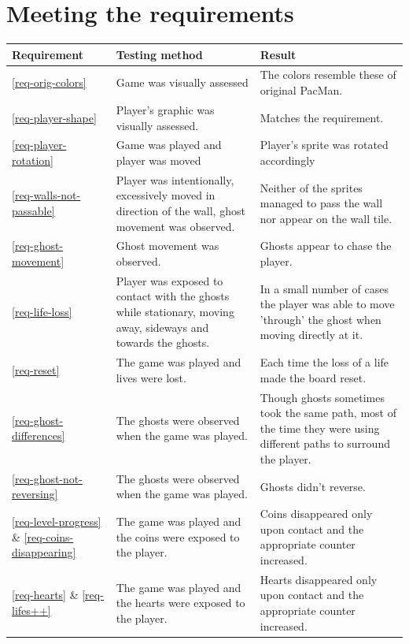 \documentclass[11pt,a4paper,notitlepage]{report}
\begin{document}
		\section{Meeting the requirements}
			\begin{center}
				\begin{longtable}{ | p{2cm} | p{5cm} | p{4cm} |}
					\hline
					Requirement&Testing method&Result \\ \hline
					\ref{req-orig-colors}&Game was visually assessed&The colors resemble these of original PacMan. \\ \hline
					\ref{req-player-shape}&Player's graphic was visually assessed.&Matches the requirement. \\ \hline
					\ref{req-player-rotation}&Game was played and player was moved&Player's sprite was rotated accordingly \\ \hline
					\ref{req-walls-not-passable}&Player was intentionally, excessively moved in direction of the wall, ghost movement was observed.&Neither of the sprites managed to pass the wall nor appear on the wall tile. \\ \hline
					\ref{req-ghost-movement}&Ghost movement was observed.&Ghosts appear to chase the player.\\ \hline
					\ref{req-life-loss}&Player was exposed to contact with the ghosts while stationary, moving away, sideways and towards the ghosts.&In a small number of cases the player was able to move 'through' the ghost when moving directly at it.\\ \hline
					\ref{req-reset}&The game was played and lives were lost.&Each time the loss of a life made the board reset.\\ \hline
					\ref{req-ghost-differences}&The ghosts were observed when the game was played.&Though ghosts sometimes took the same path, most of the time they were using different paths to surround the player.\\ \hline
					\ref{req-ghost-not-reversing}&The ghosts were observed when the game was played.&Ghosts didn't reverse. \\ \hline
					\ref{req-level-progress} \& \ref{req-coins-disappearing}&The game was played and the coins were exposed to the player.&Coins disappeared only upon contact and the appropriate counter increased. \\ \hline
					\ref{req-hearts} \& \ref{req-lifes++}&The game was played and the hearts were exposed to the player.&Hearts disappeared only upon contact and the appropriate counter increased. \\ \hline

\end{longtable}
\end{center}
\end{document}
